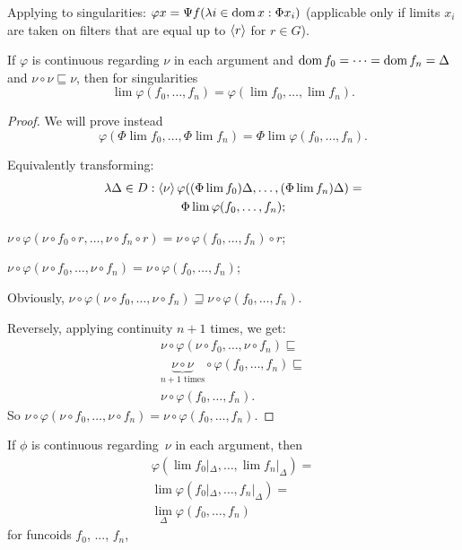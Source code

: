 \begin{defn}
  Applying to singularities: $\varphi x = \Psi f (\lambda i \in \operatorname{dom} x :
  \Phi x_i)$ (applicable only if limits $x_i$ are taken on filters that are
  equal up to $\left\langle r\right\rangle$ for $r \in G$).
\end{defn}

\begin{thm}
  If $\varphi$ is continuous regarding $\nu$ in each argument and $\operatorname{dom} f_0
  = \cdots = \operatorname{dom} f_n = \Delta$ and $\nu \circ \nu \sqsubseteq \nu$, then for singularities
\[ \lim \varphi (f_0, \ldots, f_n) = \varphi (\lim f_0, \ldots, \lim f_n). \]
\end{thm}

\begin{proof}
  We will prove instead \[ \varphi (\Phi \lim f_0, \ldots, \Phi \lim f_n) = \Phi
  \lim \varphi (f_0, \ldots, f_n). \]
  
  Equivalently transforming:
\begin{multline*}
  \lambda \Delta \in D : \left\langle \nu\right\rangle \varphi ((\Phi \lim f_0) \Delta,
  \ldots, (\Phi \lim f_n) \Delta) =\\ \Phi \lim \varphi (f_0, \ldots, f_n);
\end{multline*}  

  $\nu \circ \varphi (\nu \circ f_0 \circ r, \ldots, \nu \circ f_n \circ r) =
  \nu \circ \varphi (f_0, \ldots, f_n) \circ r$;
  
  $\nu \circ \varphi (\nu \circ f_0, \ldots, \nu \circ f_n) = \nu \circ
  \varphi (f_0, \ldots, f_n)$;
  
  Obviously, $\nu \circ \varphi (\nu \circ f_0, \ldots, \nu \circ f_n)
  \sqsupseteq \nu \circ \varphi (f_0, \ldots, f_n)$.
  
  Reversely, applying continuity $n + 1$ times, we get:
\begin{multline*}
  \nu \circ \varphi (\nu \circ f_0, \ldots, \nu \circ f_n) \sqsubseteq\\
     \underset{n + 1 \text{ times}}{\underbrace{\nu \circ \nu}} \circ \varphi
     (f_0, \ldots, f_n) \sqsubseteq\\ \nu \circ \varphi (f_0, \ldots, f_n) .
\end{multline*}
  So $\nu \circ \varphi (\nu \circ f_0, \ldots, \nu \circ f_n) = \nu \circ
  \varphi (f_0, \ldots, f_n)$.
\end{proof}

\begin{prop}
If $\phi$ is continuous regarding~$\nu$ in each argument, then
\begin{multline*}
  \varphi (\lim f_0 |_{\Delta}, \ldots, \lim f_n |_{\Delta}) =\\ \lim \varphi
  (f_0 |_{\Delta}, \ldots, f_n |_{\Delta}) =\\ \lim_{\Delta} \varphi (f_0,
  \ldots, f_n)
\end{multline*}
for funcoids $f_0$, ..., $f_n$,

\end{prop}

